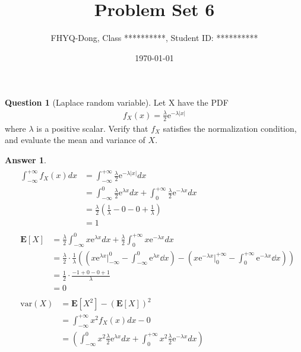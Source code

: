 \documentclass[utf8]{article}
\title{Problem Set 6}
\author{ FHYQ-Dong, Class **********, Student ID: ********** }
\date{\today}
\theoremstyle{definition}%
\newtheorem{question}{Question} %
\theoremstyle{plain}%
\newtheorem{answer}{Answer} %
\begin{document}
\maketitle
\thispagestyle{fancy}

\begin{question}[Laplace random variable]
    Let X have the PDF
    \begin{align}
        f_{X}(x) = \frac{\lambda}{2}\mathrm{e}^{-\lambda|x|}
    \end{align}
    where $\lambda$ is a positive scalar. Verify that $f_X$ satisfies the normalization condition, and evaluate the mean and variance of $X$.
\end{question}
\begin{answer}
    \begin{align}
    &\begin{aligned}
        \int_{-\infty}^{+\infty}f_{X}(x)dx &= \int_{-\infty}^{+\infty}\frac{\lambda}{2}\mathrm{e}^{-\lambda|x|}dx \\
        &= \int_{-\infty}^{0}\frac{\lambda}{2}\mathrm{e}^{\lambda x}dx + \int_{0}^{+\infty}\frac{\lambda}{2}\mathrm{e}^{-\lambda x}dx \\
        &= \frac{\lambda}{2}\left(\frac{1}{\lambda} - 0 - 0 + \frac{1}{\lambda}\right) \\
        &= 1
    \end{aligned} \\ 
    &\begin{aligned}
        \mathbf{E}[X] &= \frac{\lambda}{2}\int_{-\infty}^{0}x\mathrm{e}^{\lambda x}dx + \frac{\lambda}{2}\int_{0}^{+\infty}x\mathrm{e}^{-\lambda x}dx \\
        &= \frac{\lambda}{2}\cdot\frac{1}{\lambda}\left(\left(x\mathrm{e}^{\lambda x}\Big|_{-\infty}^{0} - \int_{-\infty}^{0}\mathrm{e}^{\lambda x}\dd{x}\right) - \left(x\mathrm{e}^{-\lambda x}\Big|_{0}^{+\infty} - \int_{0}^{+\infty}\mathrm{e}^{-\lambda x}\dd{x}\right)\right) \\ 
        &= \frac{1}{2} \cdot \frac{-1 + 0 - 0 + 1}{\lambda} \\
        &= 0
    \end{aligned} \\ 
    &\begin{aligned}
        \text{var}(X) &= \mathbf{E}[X^2] - (\mathbf{E}[X])^2 \\
        &= \int_{-\infty}^{+\infty}x^2f_{X}(x)dx - 0 \\ 
        &= \left(\int_{-\infty}^{0}x^2\frac{\lambda}{2}\mathrm{e}^{\lambda x}dx + \int_{0}^{+\infty}x^2\frac{\lambda}{2}\mathrm{e}^{-\lambda x}dx\right) \\

\end{aligned}
\end{align}
\end{answer}
\end{document}
